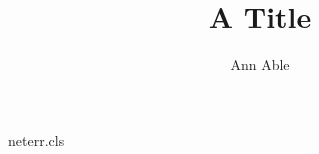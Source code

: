 \begin{filecontents*}[overwrite]{neterr.cls}
\def\@anames{}\def\@xa{}
\renewcommand\author[1]{\gdef\@anames{#1}}
\newcommand\xa[1]{\gdef\@xa{\textbf{#1\songti}}}
\renewcommand\@author{\@anames\\\@xa}
\end{filecontents*}
\documentclass{neterr}

\title{A Title}
\author{Ann Able}
\maketitle
Text.

